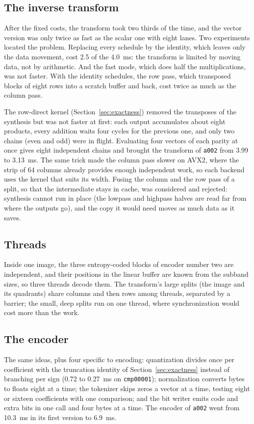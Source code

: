 \subsection{The inverse transform}

After the fixed costs, the transform took two thirds of the time, and the vector version was
only twice as fast as the scalar one with eight lanes. Two experiments located the problem.
Replacing every schedule by the identity, which leaves only the data movement, cost 2.5 of the
4.0~ms: the transform is limited by moving data, not by arithmetic. And the fast mode, which
does half the multiplications, was not faster. With the identity schedules, the row pass,
which transposed blocks of eight rows into a scratch buffer and back, cost twice as much as the
column pass.

The row-direct kernel (Section~\ref{sec:exactness}) removed the transposes of the synthesis but
was not faster at first: each output accumulates about eight products, every addition waits
four cycles for the previous one, and only two chains (even and odd) were in flight. Evaluating
four vectors of each parity at once gives eight independent chains and brought the transform of
\texttt{a002} from 3.99 to 3.13~ms. The same trick made the column pass slower on AVX2, where
the strip of 64 columns already provides enough independent work, so each backend uses the
kernel that suits its width. Fusing the column and the row pass of a split, so that the
intermediate stays in cache, was considered and rejected: synthesis cannot run in place (the
lowpass and highpass halves are read far from where the outputs go), and the copy it would need
moves as much data as it saves.

\subsection{Threads}

Inside one image, the three entropy-coded blocks of encoder number two are independent, and
their positions in the linear buffer are known from the subband sizes, so three threads decode
them. The transform's large splits (the image and its quadrants) share columns and then rows
among threads, separated by a barrier; the small, deep splits run on one thread, where
synchronization would cost more than the work.

\subsection{The encoder}

The same ideas, plus four specific to encoding: quantization divides once per coefficient with
the truncation identity of Section~\ref{sec:exactness} instead of branching per sign (0.72 to
0.27~ms on \texttt{cmp00001}); normalization converts bytes to floats eight at a time; the
tokenizer skips zeros a vector at a time, testing eight or sixteen coefficients with one
comparison; and the bit writer emits code and extra bits in one call and four bytes at a time.
The encoder of \texttt{a002} went from 10.3~ms in its first version to 6.9~ms.
